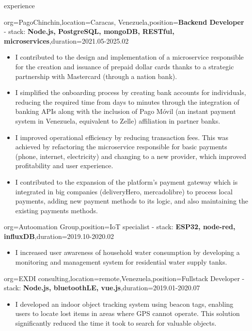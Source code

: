 \documentclass{resume}
\begin{document}
\begin{ResumeSection}{experience}
    \begin{ResumeSubsection}{org=PagoChinchin,location={Caracas, Venezuela},position={\textbf{Backend Developer} - stack: \textbf{Node.js, PostgreSQL, mongoDB, RESTful, microservices}},duration=2021.05-2025.02}
        \begin{itemize}
            \item I contributed to the design and implementation of a microservice responsible for the creation and issuance of prepaid dollar cards thanks to a strategic partnership with Mastercard (through a nation bank).
            \item I simplified the onboarding process by creating bank accounts for individuals, reducing the required time from days to minutes through the integration of banking APIs along with the inclusion of Pago Móvil (an instant payment system in Venezuela, equivalent to Zelle) affiliation in partner banks.
            \item I improved operational efficiency by reducing transaction fees. This was achieved by refactoring the microservice responsible for basic payments (phone, internet, electricity) and changing to a new provider, which improved profitability and user experience.
            \item I contributed to the expansion of the platform's payment gateway which is integrated in big companies (deliveryHero, mercadolibre) to process local payments, adding new payment methods to its logic, and also maintaining the existing payments methods. 
        \end{itemize}
    \end{ResumeSubsection}
    \begin{ResumeSubsection}{org={Autoomation Group},position={IoT specialist - stack: \textbf{ESP32, node-red, influxDB}},duration={2019.10-2020.02}}
        \begin{itemize}
            \item I increased user awareness of household water consumption by developing a monitoring and management system for residential water supply tanks.
        \end{itemize}
    \end{ResumeSubsection}
    
    \begin{ResumeSubsection}{org=EXDI consulting,location={remote,Venezuela},position={Fullstack Developer - stack: \textbf{Node.js, bluetoothLE, vue.js}},duration={2019.01-2020.07}}
        \begin{itemize}
            \item I developed an indoor object tracking system using beacon tags, enabling users to locate lost items in areas where GPS cannot operate. This solution significantly reduced the time it took to search for valuable objects.
        \end{itemize}
    \end{ResumeSubsection}
\end{ResumeSection}
\end{document}
